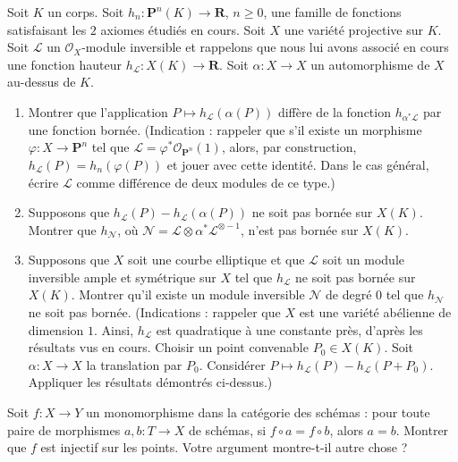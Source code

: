 \begin{exercise}[Hauteurs]
\label{exercise-heights}
Soit $K$ un corps. Soit $h_n : \mathbf{P}^n(K) \to \mathbf{R}$, $n \geq 0$,
une famille de fonctions satisfaisant les $2$ axiomes étudiés
en cours. Soit $X$ une variété projective
sur $K$. Soit $\mathcal{L}$ un $\mathcal{O}_X$-module inversible
et rappelons que nous lui avons associé en cours une
fonction hauteur $h_\mathcal{L} : X(K) \to \mathbf{R}$.
Soit $\alpha : X \to X$ un automorphisme de $X$ au-dessus de $K$.
\begin{enumerate}
\item Montrer que l'application $P \mapsto h_\mathcal{L}(\alpha(P))$
diffère de la fonction $h_{\alpha^*\mathcal{L}}$
par une fonction bornée. (Indication : rappeler que s'il existe un morphisme
$\varphi : X \to \mathbf{P}^n$ tel que
$\mathcal{L} = \varphi^*\mathcal{O}_{\mathbf{P}^n}(1)$, alors, par construction,
$h_\mathcal{L}(P) = h_n(\varphi(P))$ et jouer avec cette identité.
Dans le cas général, écrire $\mathcal{L}$ comme différence de deux modules de ce type.)
\item Supposons que $h_\mathcal{L}(P) - h_\mathcal{L}(\alpha(P))$
ne soit pas bornée sur $X(K)$. Montrer que
$h_\mathcal{N}$, où
$\mathcal{N} = \mathcal{L} \otimes \alpha^*\mathcal{L}^{\otimes -1}$,
n'est pas bornée sur $X(K)$.
\item Supposons que $X$ soit une courbe elliptique et que
$\mathcal{L}$ soit un module inversible ample et symétrique sur $X$
tel que $h_\mathcal{L}$ ne soit pas bornée sur $X(K)$. Montrer
qu'il existe un module inversible $\mathcal{N}$ de degré $0$
tel que $h_\mathcal{N}$ ne soit pas bornée.
(Indications : rappeler que $X$ est une variété abélienne de dimension $1$.
Ainsi, $h_\mathcal{L}$ est quadratique à une constante près, d'après les résultats
vus en cours. Choisir un point convenable $P_0 \in X(K)$.
Soit $\alpha : X \to X$ la translation par $P_0$. Considérer
$P \mapsto h_\mathcal{L}(P) - h_\mathcal{L}(P + P_0)$.
Appliquer les résultats démontrés ci-dessus.)
\end{enumerate}
\end{exercise}

\begin{exercise}[Monomorphismes]
\label{exercise-monomorphisms}
Soit $f : X \to Y$ un monomorphisme dans la catégorie des schémas :
pour toute paire de morphismes $a, b : T \to X$ de schémas, si
$f \circ a = f \circ b$, alors $a = b$. Montrer que $f$ est injectif
sur les points. Votre argument montre-t-il autre chose ?
\end{exercise}

